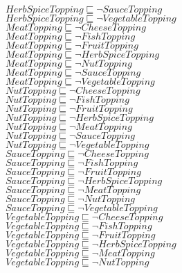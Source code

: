 \documentclass[a4paper,10pt]{article}
\begin{document}
 $HerbSpiceTopping \sqsubseteq  \lnot SauceTopping$\\ 
 $HerbSpiceTopping \sqsubseteq  \lnot VegetableTopping$\\ 
 $MeatTopping \sqsubseteq  \lnot CheeseTopping$\\ 
 $MeatTopping \sqsubseteq  \lnot FishTopping$\\ 
 $MeatTopping \sqsubseteq  \lnot FruitTopping$\\ 
 $MeatTopping \sqsubseteq  \lnot HerbSpiceTopping$\\ 
 $MeatTopping \sqsubseteq  \lnot NutTopping$\\ 
 $MeatTopping \sqsubseteq  \lnot SauceTopping$\\ 
 $MeatTopping \sqsubseteq  \lnot VegetableTopping$\\ 
 $NutTopping \sqsubseteq  \lnot CheeseTopping$\\ 
 $NutTopping \sqsubseteq  \lnot FishTopping$\\ 
 $NutTopping \sqsubseteq  \lnot FruitTopping$\\ 
 $NutTopping \sqsubseteq  \lnot HerbSpiceTopping$\\ 
 $NutTopping \sqsubseteq  \lnot MeatTopping$\\ 
 $NutTopping \sqsubseteq  \lnot SauceTopping$\\ 
 $NutTopping \sqsubseteq  \lnot VegetableTopping$\\ 
 $SauceTopping \sqsubseteq  \lnot CheeseTopping$\\ 
 $SauceTopping \sqsubseteq  \lnot FishTopping$\\ 
 $SauceTopping \sqsubseteq  \lnot FruitTopping$\\ 
 $SauceTopping \sqsubseteq  \lnot HerbSpiceTopping$\\ 
 $SauceTopping \sqsubseteq  \lnot MeatTopping$\\ 
 $SauceTopping \sqsubseteq  \lnot NutTopping$\\ 
 $SauceTopping \sqsubseteq  \lnot VegetableTopping$\\ 
 $VegetableTopping \sqsubseteq  \lnot CheeseTopping$\\ 
 $VegetableTopping \sqsubseteq  \lnot FishTopping$\\ 
 $VegetableTopping \sqsubseteq  \lnot FruitTopping$\\ 
 $VegetableTopping \sqsubseteq  \lnot HerbSpiceTopping$\\ 
 $VegetableTopping \sqsubseteq  \lnot MeatTopping$\\ 
 $VegetableTopping \sqsubseteq  \lnot NutTopping$\\ 
\end{document}

